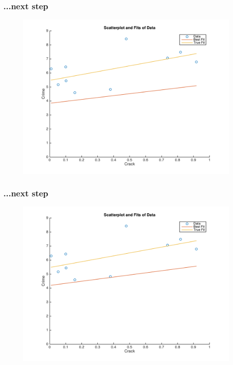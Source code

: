 \documentclass{beamer}
\begin{document}
\begin{frame}
\frametitle[alignment=center]{...next step}
\begin{figure}
\centering
\includegraphics[scale=0.5]{Newton_OLS_Figure_6.png}
\end{figure}
\end{frame}

\begin{frame}
\frametitle[alignment=center]{...next step}
\begin{figure}
\centering
\includegraphics[scale=0.5]{Newton_OLS_Figure_7.png}
\end{figure}
\end{frame}
\end{document}
